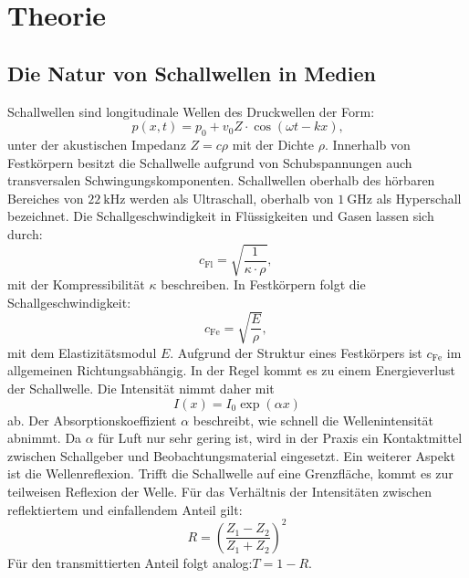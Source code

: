 
\section{Theorie}
\label{sec:Theorie}
\subsection{Die Natur von Schallwellen in Medien}
Schallwellen sind longitudinale Wellen des Druckwellen der Form:
\begin{equation}
  p \left( x , t \right) = p_0 + v_0 Z \cdot \cos \left(\omega t -kx \right)\text{,}\label{eq:Schallwelle}
  \end{equation}
unter der akustischen Impedanz $Z = c \rho$ mit der Dichte $\rho$. Innerhalb von Festkörpern besitzt die Schallwelle
aufgrund von Schubspannungen auch transversalen Schwingungskomponenten.
Schallwellen oberhalb des hörbaren Bereiches von $\SI{22}{\kilo\hertz}$ werden als
Ultraschall, oberhalb von $\SI{1}{\giga\hertz}$ als Hyperschall bezeichnet. Die
Schallgeschwindigkeit in Flüssigkeiten und Gasen lassen sich durch:
\begin{equation}
  c_\text{Fl} = \sqrt{\frac{1}{\kappa \cdot \rho}}\text{, }\label{Fl}
\end{equation}
mit der Kompressibilität $\kappa$ beschreiben. In Festkörpern folgt die Schallgeschwindigkeit:
\begin{equation}
  c_\text{Fe} = \sqrt{\frac{E}{\rho}}\text{, }\label{Fe}
\end{equation}
mit dem Elastizitätsmodul $E$.
Aufgrund der Struktur eines Festkörpers ist $c_\text{Fe}$ im allgemeinen Richtungsabhängig.
In der Regel kommt es zu einem Energieverlust der Schallwelle. Die Intensität nimmt daher mit
\begin{equation}
  I\left(x\right) = I_0 \exp\left(\alpha x\right)\label{I}
\end{equation}
ab. Der Absorptionskoeffizient $\alpha$ beschreibt, wie schnell die Wellenintensität
abnimmt. Da $\alpha$ für Luft nur sehr gering ist, wird in der Praxis ein Kontaktmittel
zwischen Schallgeber und Beobachtungsmaterial eingesetzt. Ein weiterer Aspekt ist die Wellenreflexion.
Trifft die Schallwelle auf eine Grenzfläche, kommt es zur teilweisen Reflexion der Welle.
Für das Verhältnis der Intensitäten zwischen reflektiertem und einfallendem Anteil gilt:
\begin{equation}
  R = \left(\frac{Z_1-Z_2}{Z_1+Z_2}\right)^2
\end{equation}
Für den transmittierten Anteil folgt analog:$ T = 1-R $.
